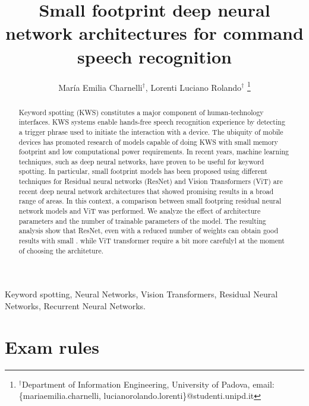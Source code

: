 \documentclass[10pt, conference, letterpaper]{IEEEtran}
\title{Small footprint deep neural network architectures for command speech recognition}
\author{María Emilia Charnelli$^\dag$, Lorenti Luciano Rolando$^\dag$
\thanks{$^\dag$Department of Information Engineering, University of Padova, email: \{mariaemilia.charnelli, lucianorolando.lorenti\}@studenti.unipd.it}

}
\begin{document}
\maketitle

\begin{abstract}

Keyword  spotting  (KWS)  constitutes  a  major  component  of human-technology interfaces. KWS systems enable hands-free speech recognition experience by detecting a trigger phrase used to initiate the interaction with a device. The ubiquity of mobile devices has promoted research of models capable of doing KWS with small memory footprint and low computational power requirements.
In recent years, machine learning techniques, such as deep neural networks, have proven to be useful for keyword spotting. In particular, small footprint models has been proposed using different techniques for  
Residual neural networks (ResNet) and Vision Transformers  (ViT) are recent deep neural network architectures that showed promising results in a broad range of areas. In this context, a comparison between small footpring residual neural network models and ViT was performed. We  analyze  the  effect  of architecture  parameters and the number of trainable parameters of the model. 
The resulting analysis show that ResNet, even with a reduced number of weights can obtain good results with small . while ViT transformer require a bit more carefulyl at the moment of choosing the architeture.
\end{abstract}

\IEEEkeywords
Keyword  spotting, Neural Networks, Vision Transformers, Residual Neural Networks, Recurrent Neural Networks. 
\endIEEEkeywords












\section{Exam rules}
\end{document}
